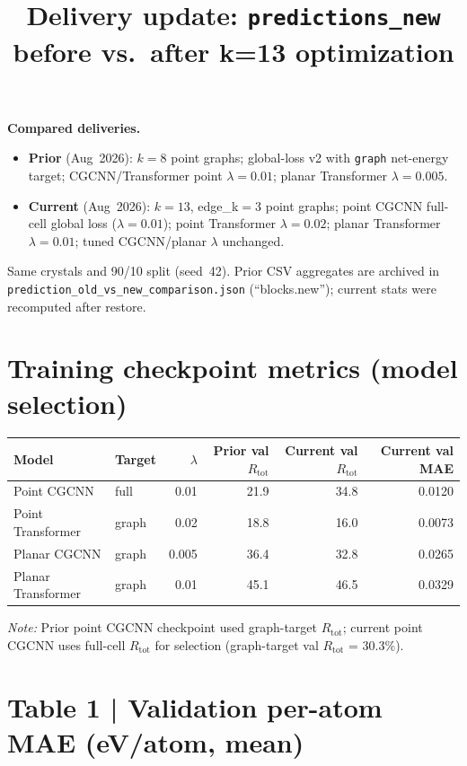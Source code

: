 \documentclass[11pt,a4paper]{article}
\begin{document}
\title{Delivery update: \texttt{predictions\_new} before vs.\ after k=13 optimization}
\date{}
\maketitle

\noindent\textbf{Compared deliveries.}
\begin{itemize}
  \item \textbf{Prior} (Aug~2026): $k=8$ point graphs; global-loss v2 with \texttt{graph} net-energy target; CGCNN/Transformer point $\lambda=0.01$; planar Transformer $\lambda=0.005$.
  \item \textbf{Current} (Aug~2026): $k=13$, edge\_k$=3$ point graphs; point CGCNN full-cell global loss ($\lambda=0.01$); point Transformer $\lambda=0.02$; planar Transformer $\lambda=0.01$; tuned CGCNN/planar $\lambda$ unchanged.
\end{itemize}
Same crystals and 90/10 split (seed~42). Prior CSV aggregates are archived in \texttt{prediction\_old\_vs\_new\_comparison.json} (``blocks.new''); current stats were recomputed after restore.

\section*{Training checkpoint metrics (model selection)}

\begin{center}
\small
\begin{tabular}{l l r r r r}
  \toprule
  Model & Target & $\lambda$ & Prior val $R_{\mathrm{tot}}$ & Current val $R_{\mathrm{tot}}$ & Current val MAE \\
  \midrule
  Point CGCNN & full & 0.01 & 21.9 & 34.8 & 0.0120 \\
  Point Transformer & graph & 0.02 & 18.8 & 16.0 & 0.0073 \\
  Planar CGCNN & graph & 0.005 & 36.4 & 32.8 & 0.0265 \\
  Planar Transformer & graph & 0.01 & 45.1 & 46.5 & 0.0329 \\
  \bottomrule
\end{tabular}
\end{center}

\noindent\textit{Note:} Prior point CGCNN checkpoint used graph-target $R_{\mathrm{tot}}$; current point CGCNN uses full-cell $R_{\mathrm{tot}}$ for selection (graph-target val $R_{\mathrm{tot}}$ = 30.3\%).

\section*{Table 1 | Validation per-atom MAE (eV/atom, mean)}
\end{document}
